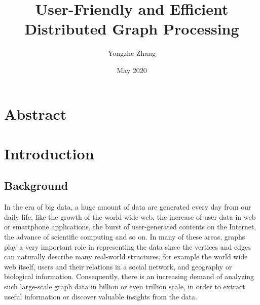 \documentclass{sokendai_thesis} %
\title{User-Friendly and Efficient Distributed Graph Processing}
\author{Yongzhe Zhang}
\date{May 2020}
\begin{document}
\frontmatter
\maketitle


\chapter*{Abstract}



\tableofcontents
\listoffigures
\listoftables
\listofalgorithms {}


\mainmatter

\chapter{Introduction}
\label{chap:introduction}


\section{Background}

In the era of big data, a huge amount of data are generated every day from our daily life, like the growth of the world wide web, the increase of user data in web or smartphone applications, the burst of user-generated contents on the Internet, the advance of scientific computing and so on.
In many of these areas, graphs play a very important role in representing the data since the vertices and edges can naturally describe many real-world structures, for example the world wide web itself, users and their relations in a social network, and geography or biological information.
Consequently, there is an increasing demand of analyzing such large-scale graph data in billion or even trillion scale, in order to extract useful information or discover valuable insights from the data.
\end{document}
